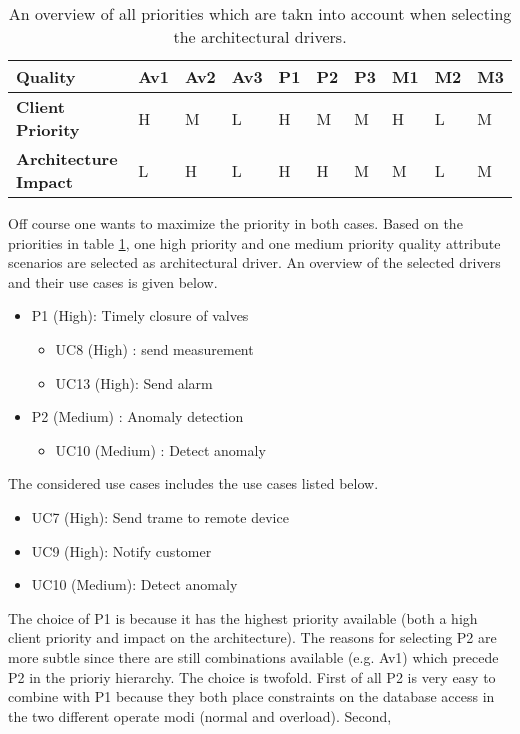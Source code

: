\begin{table}
	\begin{center}
		\begin{tabular}{| l | l | l | l | l | l | l | l | l | l |}
		\hline
		\textbf{Quality}			&	Av1	&	Av2	&	Av3	&	P1	&	P2	&	P3	&	M1	&	M2	&	M3	\\
		\hline
		\textbf{Client Priority}	&	H	&	M	&	L	&	H	&	M	&	M	&	H	&	L	&	M	\\
		\hline
		\textbf{Architecture Impact}&	L	&	H	&	L	&	H	&	H	&	M	&	M	&	L	&	M	\\
		\hline
		\end{tabular}
		\caption{An overview of all priorities which are takn into account when
		selecting the architectural drivers.}
		\label{table:add/it1/priorities}
	\end{center}
\end{table}

\npar Off course one wants to maximize the priority in both cases. Based on the
priorities in table \ref{table:add/it1/priorities}, one high priority and one medium
priority quality attribute scenarios are selected as architectural driver. An
overview of the selected drivers and their use cases is given below.

\begin{itemize}
  	\item P1 (High): Timely closure of valves
  	\begin{itemize}
  	  	\item UC8 (High) : send measurement
  		\item UC13 (High): Send alarm 
  	\end{itemize}
  	\item P2 (Medium) : Anomaly detection
  	\begin{itemize}
  	  \item UC10 (Medium) : Detect anomaly %
  	\end{itemize} 
\end{itemize}

\npar The considered use cases includes the use cases listed below. 

\begin{itemize}
	\item UC7 (High): Send trame to remote device
	\item UC9 (High): Notify customer
	\item UC10 (Medium): Detect anomaly
\end{itemize}

\npar The choice of P1 is because it has the highest priority available (both a
high client priority and impact on the architecture). The reasons for selecting
P2 are more subtle since there are still combinations available (e.g. Av1) which
precede P2 in the prioriy hierarchy. The choice is twofold. First of all P2 is
very easy to combine with P1 because they both place constraints on the database
access in the two different operate modi (normal and overload). Second, 

